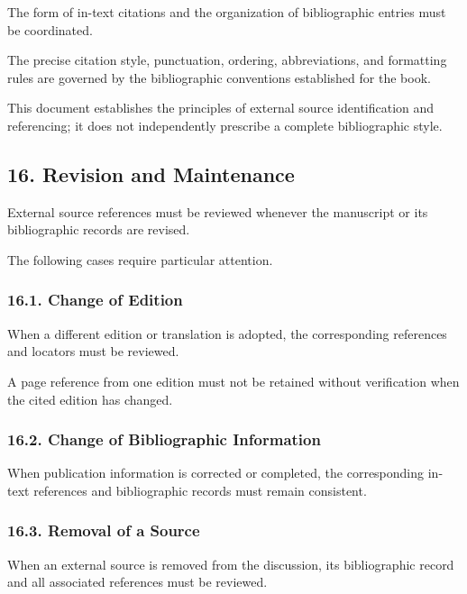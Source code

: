 The form of in-text citations
and the organization of
bibliographic entries must
be coordinated.

The precise citation style,
punctuation, ordering,
abbreviations, and formatting
rules are governed by
the bibliographic conventions
established for the book.

This document establishes
the principles of external
source identification and
referencing; it does not
independently prescribe
a complete bibliographic
style.


\subsection*{16. Revision and Maintenance}

External source references
must be reviewed whenever
the manuscript or its
bibliographic records
are revised.

The following cases require
particular attention.

\subsubsection*{16.1. Change of Edition}

When a different edition
or translation is adopted,
the corresponding references
and locators must be reviewed.

A page reference from one
edition must not be retained
without verification when
the cited edition has changed.

\subsubsection*{16.2. Change of Bibliographic Information}

When publication information
is corrected or completed,
the corresponding in-text
references and bibliographic
records must remain consistent.

\subsubsection*{16.3. Removal of a Source}

When an external source
is removed from the discussion,
its bibliographic record
and all associated references
must be reviewed.

